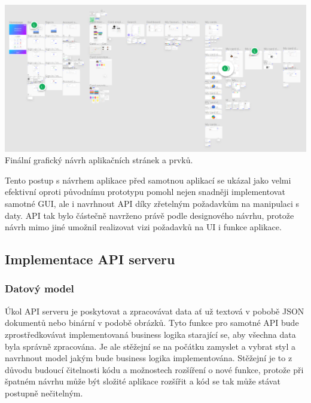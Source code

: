 		\includegraphics[width=0.24\linewidth]{obrazky/finalni_navrh}\hfill
		Finální grafický návrh aplikačních stránek a prvků. %

		Tento postup s návrhem aplikace před samotnou aplikací se ukázal jako velmi efektivní oproti původnímu prototypu
		pomohl nejen snadněji implementovat samotné \ac{GUI}, ale i navrhnout \ac{API} díky zřetelným požadavkům na
		manipulaci s daty.
		\ac{API} tak bylo částečně navrženo právě podle designového návrhu, protože návrh mimo jiné umožnil realizovat
		vizi požadavků na \ac{UI} i funkce aplikace.

	\subsection{Implementace API serveru}

		\subsubsection{Datový model}

		Úkol API serveru je poskytovat a zpracovávat data ať už textová v pobobě \ac{JSON} dokumentů nebo binární v podobě
		obrázků.
		Tyto funkce pro samotné API bude zprostředkovávat implementovaná business logika starající se, aby všechna data
		byla správně zpracována.
		Je ale stěžejní se na počátku zamyslet a vybrat styl a navrhnout model jakým bude business logika implementována.
		Stěžejní je to z důvodu budoucí čitelnosti kódu a možnostech rozšíření o nové funkce, protože při špatném
		návrhu může být složité aplikace rozšířit a kód se tak může stávat postupně nečitelným.

